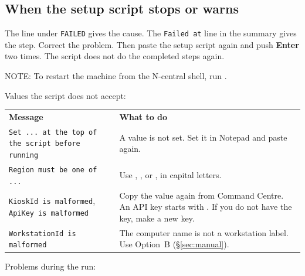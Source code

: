 \documentclass[a4paper,10pt]{article}
\begin{document}
\subsection{When the setup script stops or warns}\label{sec:scripttrouble}

The line under \texttt{FAILED} gives the cause. The \texttt{Failed at}
line in the summary gives the step. Correct the problem. Then paste the
setup script again and push \textbf{Enter} two times. The script does not
do the completed steps again.

\noindent NOTE: To restart the machine from the N-central shell, run
.

\medskip\noindent Values the script does not accept:

\begin{center}
\renewcommand{\arraystretch}{1.35}\small
\begin{tabularx}{\textwidth}{L{62mm} X}
\color{white}\textbf{Message} &
\color{white}\textbf{What to do}\\
\texttt{Set ... at the top of the script before running} &
A value is not set. Set it in Notepad and paste again.\\
\texttt{Region must be one of ...} &
Use , ,  or , in capital
letters.\\
\texttt{KioskId is malformed}, \texttt{ApiKey is malformed} &
Copy the value again from Command Centre. An API key starts with
. If you do not have the key, make a new key.\\
\texttt{WorkstationId is malformed} &
The computer name is not a workstation label. Use Option~B
(\S\ref{sec:manual}).\\
\end{tabularx}
\end{center}

\noindent Problems during the run:
\end{document}
